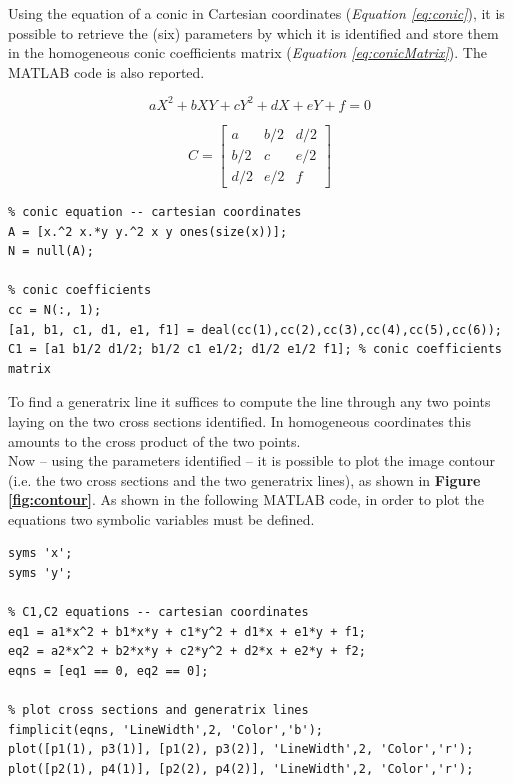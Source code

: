 \documentclass[12pt,a4paper]{article}
\begin{document}
Using the equation of a conic in Cartesian coordinates (\textit{Equation \ref{eq:conic}}), it is possible to retrieve the (six) parameters by which it is identified and store them in the homogeneous conic coefficients matrix (\textit{Equation \ref{eq:conicMatrix}}). The MATLAB code is also reported.

\begin{equation}
    aX^2+bXY+cY^2+dX+eY+f=0
    \label{eq:conic}
\end{equation}

\begin{equation}
    C =
    \begin{bmatrix}
    a & b/2 & d/2\\
    b/2 & c & e/2\\
    d/2 & e/2 & f
    \end{bmatrix}
    \label{eq:conicMatrix}
\end{equation}
\bigskip

\begin{verbatim}
% conic equation -- cartesian coordinates
A = [x.^2 x.*y y.^2 x y ones(size(x))];
N = null(A);

% conic coefficients
cc = N(:, 1);
[a1, b1, c1, d1, e1, f1] = deal(cc(1),cc(2),cc(3),cc(4),cc(5),cc(6));
C1 = [a1 b1/2 d1/2; b1/2 c1 e1/2; d1/2 e1/2 f1]; % conic coefficients matrix
\end{verbatim}

To find a generatrix line it suffices to compute the line through any two points laying on the two cross sections identified. In homogeneous coordinates this amounts to the cross product of the two points.\\

Now -- using the parameters identified -- it is possible to plot the image contour (i.e. the two cross sections and the two generatrix lines), as shown in \textbf{Figure \ref{fig:contour}}. As shown in the following MATLAB code, in order to plot the equations two symbolic variables must be defined.

\begin{verbatim}
syms 'x';
syms 'y';

% C1,C2 equations -- cartesian coordinates
eq1 = a1*x^2 + b1*x*y + c1*y^2 + d1*x + e1*y + f1;
eq2 = a2*x^2 + b2*x*y + c2*y^2 + d2*x + e2*y + f2;
eqns = [eq1 == 0, eq2 == 0];

% plot cross sections and generatrix lines
fimplicit(eqns, 'LineWidth',2, 'Color','b');
plot([p1(1), p3(1)], [p1(2), p3(2)], 'LineWidth',2, 'Color','r');
plot([p2(1), p4(1)], [p2(2), p4(2)], 'LineWidth',2, 'Color','r');
\end{verbatim}
\end{document}
